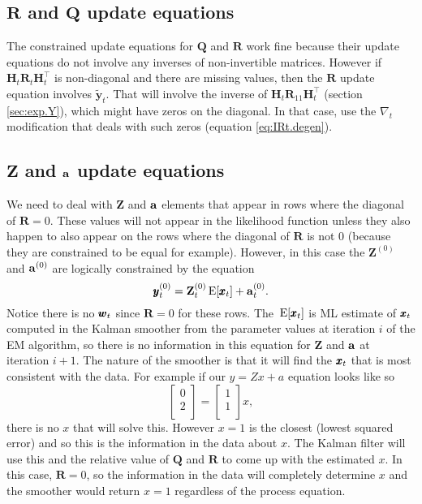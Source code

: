 \documentclass[]{article}
\def\ZZ{\mbox{$\mathbf Z$}}	\def\zz{\mbox{$\mathbf z$}}
\def\HH{\mbox{$\mathbf H$}}	\def\hh{\mbox{$\mathbf h$}}
\def\QQ{\mbox{$\mathbf Q$}}	 \def\qq{\mbox{$\mathbf q$}}
\def\RR{\mbox{$\mathbf R$}}	 \def\rr{\mbox{$\mathbf r$}}
\def\E{\,\textup{\textrm{E}}}
\def\hatyt{\widetilde{\mbox{$\mathbf y$}}_t}
\def\IR{\nabla}
\begin{document}
\subsection{$\RR$ and $\QQ$ update equations}
The constrained update equations for  $\QQ$ and $\RR$ work fine because their update equations do not involve any inverses of non-invertible matrices. However if $\HH_t\RR_t\HH_t^\top$ is non-diagonal and there are missing values, then the $\RR$ update equation  involves $\hatyt$. That will involve the inverse of $\HH_t\RR_{11}\HH_t^\top$  (section \ref{sec:exp.Y}), which might have zeros on the diagonal.  In that case, use the $\IR_t$ modification that deals with such zeros (equation \ref{eq:IRt.degen}).


\subsection{$\ZZ$ and $\aa$ update equations}
We need to deal with $\ZZ$ and $\aa$ elements that appear in rows where the diagonal of $\RR=0$.  These values will not appear in the likelihood function unless they also happen to also appear on the rows where the diagonal of $\RR$ is not 0 (because they are constrained to be equal for example).  However, in this case the $\ZZ^{(0)}$ and $\aa^{(0)}$ are logically constrained by the equation
$$\yy_t^{(0)}=\ZZ_t^{(0)}\E[\xx_t]+\aa_t^{(0)}.$$
Notice there is no $\ww_t$ since $\RR=0$ for these rows.  The $\E[\xx_t]$ is ML estimate of $\xx_t$ computed in the Kalman smoother from the parameter values at iteration $i$ of the EM algorithm, so there is no information in this equation for $\ZZ$ and $\aa$ at iteration $i+1$.  The nature of the smoother is that it will find the $\xx_t$ that is most consistent with the data.  For example if our $y=Zx+a$ equation looks like so
\begin{equation}
\begin{bmatrix}
0\\
2\\
\end{bmatrix}
=
\begin{bmatrix}
1\\
1\\
\end{bmatrix}
x,
\end{equation}
there is no $x$ that will solve this.  However $x=1$ is the closest (lowest squared error) and so this is the information in the data about $x$.  The Kalman filter will use this and the relative value of $\QQ$ and $\RR$ to come up with the estimated $x$.  In this case, $\RR=0$, so the information in the data will completely determine $x$ and the smoother would return $x=1$ regardless of the process equation.
\end{document}
